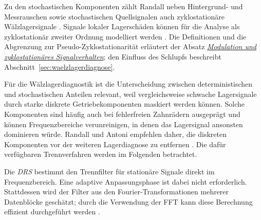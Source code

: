 Zu den stochastischen Komponenten zählt Randall neben Hintergrund- und Messrauschen sowie
stochastischen Quellsignalen auch zyklostationäre Wälzlagersignale
\cite[S.~178, Abschn.~5.3]{randallVibrationbasedConditionMonitoring2022}.
Signale lokaler Lagerschäden können für die Analyse als zyklostationär zweiter
Ordnung modelliert werden
\cite[S.~487; S.~490--491, Abschn.~2--2.1 und Abb.~4--5]
{randallRollingElementBearing2011a}.
Die Definitionen und die Abgrenzung zur Pseudo-Zyklostationarität erläutert der Absatz
\hyperref[par:modulation_zyklostationaeres_signalverhalten]
{\emph{Modulation und zyklostationäres Signalverhalten}};
den Einfluss des Schlupfs beschreibt Abschnitt~\ref{sec:waelzlagerdiagnose}.

Für die Wälzlagerdiagnostik ist die Unterscheidung zwischen deterministischen und
stochastischen Anteilen relevant, weil vergleichsweise schwache
Lagersignale durch starke diskrete Getriebekomponenten maskiert werden können. Solche
Komponenten sind häufig auch bei fehlerfreien Zahnrädern ausgeprägt und können
Frequenzbereiche verunreinigen, in denen das Lagersignal ansonsten dominieren würde. Randall
und Antoni empfehlen daher, die diskreten Komponenten vor der weiteren Lagerdiagnose zu
entfernen \cite[S.~493, Abschn.~3]{randallRollingElementBearing2011a}. Die dafür
verfügbaren Trennverfahren werden im Folgenden betrachtet.

Die \emph{\gls{DRS}} bestimmt den Trennfilter für stationäre Signale direkt im
Frequenzbereich. Eine adaptive Anpassungsphase ist dabei nicht erforderlich.
Stattdessen wird der Filter aus den Fourier-Transformationen
mehrerer Datenblöcke geschätzt; durch die Verwendung der FFT kann diese
Berechnung effizient durchgeführt werden
\cites[S.~103--104, Abschn.~1--2]
{antoniUnsupervisedNoiseCancellation2004}
[S.~185--186, Abschn.~5.3.5]
{randallVibrationbasedConditionMonitoring2022}.

